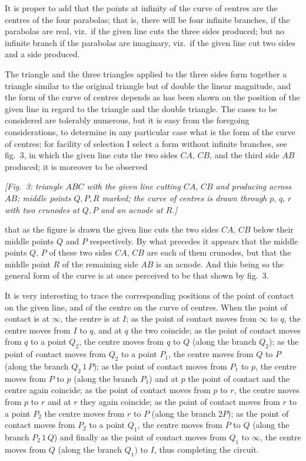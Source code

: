 \documentclass[11pt,a4paper]{article}
\begin{document}
\medskip

It is proper to add that the points at infinity of the curve of centres are the centres of the four parabolas; that is, there will be four infinite branches, if the parabolas are real, viz.\ if the given line cuts the three sides produced; but no infinite branch if the parabolas are imaginary, viz.\ if the given line cut two sides and a side produced.

\medskip

The triangle and the three triangles applied to the three sides form together a triangle similar to the original triangle but of double the linear magnitude, and the form of the curve of centres depends as has been shown on the position of the given line in regard to the triangle and the double triangle. The cases to be considered are tolerably numerous, but it is easy from the foregoing considerations, to determine in any particular case what is the form of the curve of centres; for facility of selection I select a form without infinite branches, see fig.~3, in which the given line cuts the two sides $CA,\,CB$, and the third side $AB$ produced; it is moreover to be observed

\begin{center}\textit{[Fig.~3: triangle $ABC$ with the given line cutting $CA,\,CB$ and producing across $AB$; middle points $Q,P,R$ marked; the curve of centres is drawn through $p,\,q,\,r$ with two crunodes at $Q,P$ and an acnode at $R$.]}\end{center}

that as the figure is drawn the given line cuts the two sides $CA,\,CB$ below their middle points $Q$ and $P$ respectively. By what precedes it appears that the middle points $Q,\,P$ of these two sides $CA,\,CB$ are each of them crunodes, but that the middle point $R$ of the remaining side $AB$ is an acnode. And this being so the general form of the curve is at once perceived to be that shown by fig.~3.

\medskip

It is very interesting to trace the corresponding positions of the point of contact on the given line, and of the centre on the curve of centres. When the point of contact is at $\infty$, the centre is at $I$; as the point of contact moves from $\infty$ to $q$, the centre moves from $I$ to $q$, and at $q$ the two coincide; as the point of contact moves from $q$ to a point $Q_2$, the centre moves from $q$ to $Q$ (along the branch $Q_2$); as the point of contact moves from $Q_2$ to a point $P_1$, the centre moves from $Q$ to $P$ (along the branch $Q_2\,1\,P$); as the point of contact moves from $P_1$ to $p$, the centre moves from $P$ to $p$ (along the branch $P_1$) and at $p$ the point of contact and the centre again coincide; as the point of contact moves from $p$ to $r$, the centre moves from $p$ to $r$ and at $r$ they again coincide; as the point of contact moves from $r$ to a point $P_2$ the centre moves from $r$ to $P$ (along the branch $2P$); as the point of contact moves from $P_2$ to a point $Q_1$, the centre moves from $P$ to $Q$ (along the branch $P_2\,1\,Q$) and finally as the point of contact moves from $Q_1$ to $\infty$, the centre moves from $Q$ (along the branch $Q_1$) to $I$, thus completing the circuit.
\end{document}
